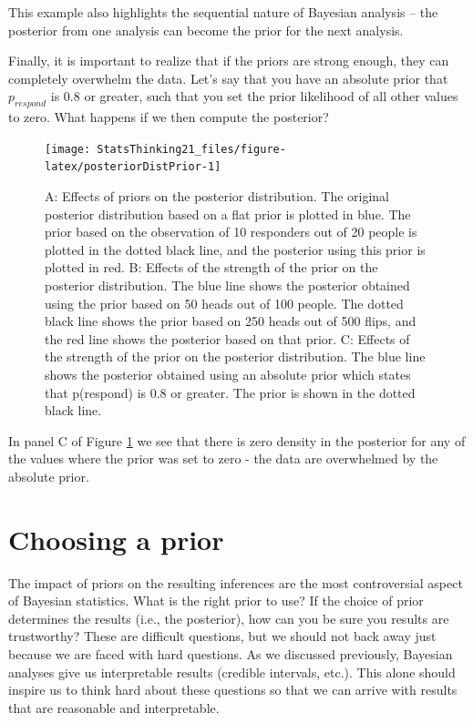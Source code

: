 \documentclass[
  12pt,
]{book}
\begin{document}
This example also highlights the sequential nature of Bayesian analysis -- the posterior from one analysis can become the prior for the next analysis.

Finally, it is important to realize that if the priors are strong enough, they can completely overwhelm the data. Let's say that you have an absolute prior that \(p_{respond}\) is 0.8 or greater, such that you set the prior likelihood of all other values to zero. What happens if we then compute the posterior?

\begin{figure}
\texttt{[image: StatsThinking21\_files/figure-latex/posteriorDistPrior-1]} \caption{A: Effects of priors on the posterior distribution.  The original posterior distribution based on a flat prior is plotted in blue. The prior based on the observation of 10 responders out of 20 people is plotted in the dotted black line, and the posterior using this prior is plotted in red.  B: Effects of the strength of the prior on the posterior distribution. The blue line shows the posterior obtained using the prior based on 50 heads out of 100 people.  The dotted black line shows the prior based on 250 heads out of 500 flips, and the red line shows the posterior based on that prior. C: Effects of the strength of the prior on the posterior distribution. The blue line shows the posterior obtained using an absolute prior which states that p(respond) is 0.8 or greater.  The prior is shown in the dotted black line.}\label{fig:posteriorDistPrior}
\end{figure}

In panel C of Figure \ref{fig:posteriorDistPrior} we see that there is zero density in the posterior for any of the values where the prior was set to zero - the data are overwhelmed by the absolute prior.

\hypertarget{choosing-a-prior}{%
\section{Choosing a prior}\label{choosing-a-prior}}

The impact of priors on the resulting inferences are the most controversial aspect of Bayesian statistics. What is the right prior to use? If the choice of prior determines the results (i.e., the posterior), how can you be sure you results are trustworthy? These are difficult questions, but we should not back away just because we are faced with hard questions. As we discussed previously, Bayesian analyses give us interpretable results (credible intervals, etc.). This alone should inspire us to think hard about these questions so that we can arrive with results that are reasonable and interpretable.
\end{document}

